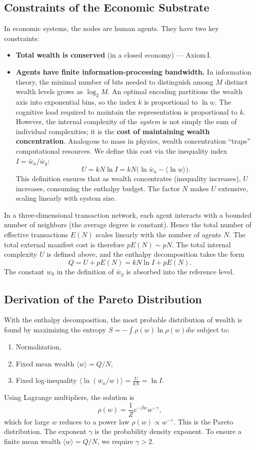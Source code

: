 \documentclass{article}
\begin{document}
\subsection{Constraints of the Economic Substrate}
In economic systems, the nodes are human agents. They have two key constraints:
\begin{itemize}
    \item \textbf{Total wealth is conserved} (in a closed economy) — Axiom I.
    \item \textbf{Agents have finite information‑processing bandwidth.} In information theory, the minimal number of bits needed to distinguish among $M$ distinct wealth levels grows as $\log_2 M$. An optimal encoding partitions the wealth axis into exponential bins, so the index $k$ is proportional to $\ln w$. The cognitive load required to maintain the representation is proportional to $k$. However, the internal complexity of the \textit{system} is not simply the sum of individual complexities; it is the \textbf{cost of maintaining wealth concentration}. Analogous to mass in physics, wealth concentration “traps” computational resources. We define this cost via the inequality index $I = \bar{w}_a / \bar{w}_g$:
\[
U = k N \ln I = k N \bigl( \ln \bar{w}_a - \langle \ln w \rangle \bigr).
\]
This definition ensures that as wealth concentrates (inequality increases), $U$ increases, consuming the enthalpy budget. The factor $N$ makes $U$ extensive, scaling linearly with system size.
\end{itemize}
In a three‑dimensional transaction network, each agent interacts with a bounded number of neighbors (the average degree is constant). Hence the total number of effective transactions $E(N)$ scales linearly with the number of agents $N$. The total external manifest cost is therefore $p E(N) \sim pN$. The total internal complexity $U$ is defined above, and the enthalpy decomposition takes the form
\[
Q = U + p E(N) = k N \ln I + p E(N).
\]
The constant $w_0$ in the definition of $\bar{w}_g$ is absorbed into the reference level.

\subsection{Derivation of the Pareto Distribution}
With the enthalpy decomposition, the most probable distribution of wealth is found by maximizing the entropy $S = -\int \rho(w) \ln \rho(w) dw$ subject to:
\begin{enumerate}
    \item Normalization,
    \item Fixed mean wealth $\langle w \rangle = Q/N$,
    \item Fixed log‑inequality $\langle \ln (\bar{w}_a / w) \rangle = \frac{U}{kN} = \ln I$.
\end{enumerate}
Using Lagrange multipliers, the solution is
\[
\rho(w) = \frac{1}{Z} e^{-\beta w} w^{-\gamma},
\]
which for large $w$ reduces to a power law $\rho(w) \propto w^{-\gamma}$. This is the Pareto distribution. The exponent $\gamma$ is the probability density exponent. To ensure a finite mean wealth $\langle w \rangle = Q/N$, we require $\gamma > 2$.
\end{document}
